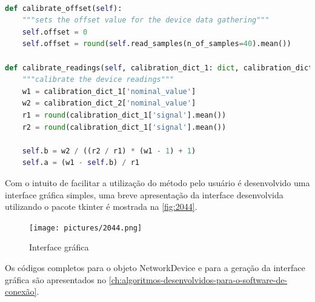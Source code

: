 \begin{lstlisting}[label={lst:objectcalibration},language=Python,caption={[Network Device calibrate offset]{Métodos de calibração do objeto NetworkDevice}}]

def calibrate_offset(self):
	"""sets the offset value for the device data gathering"""
	self.offset = 0
	self.offset = round(self.read_samples(n_of_samples=40).mean())

def calibrate_readings(self, calibration_dict_1: dict, calibration_dict_2: dict):
	"""calibrate the device readings"""
	w1 = calibration_dict_1['nominal_value']
	w2 = calibration_dict_2['nominal_value']
	r1 = round(calibration_dict_1['signal'].mean())
	r2 = round(calibration_dict_1['signal'].mean())

	self.b = w2 / ((r2 / r1) * (w1 - 1) + 1)
	self.a = (w1 - self.b) / r1

\end{lstlisting}

Com o intuito de facilitar a utilização do método pelo usuário é desenvolvido uma interface gráfica simples, uma breve apresentação da interface desenvolvida utilizando o pacote tkinter é mostrada na \autoref{fig:2044}.

\begin{figure}[H]
	\caption{\label{fig:2044} Interface gráfica}
		\begin{center}
			\texttt{[image: pictures/2044.png]}
		\end{center}
\end{figure}

Os códigos completos para o objeto NetworkDevice e para a geração da interface gráfica são apresentados no \autoref{ch:algoritmos-desenvolvidos-para-o-software-de-conexão}.
